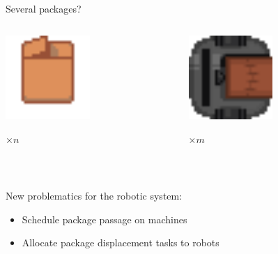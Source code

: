 \begin{frame}{Several packages?}
    \begin{columns}
        \begin{column}{0.5\textwidth}
            \centering
            \includegraphics[width = 0.5\textwidth]{images/godot/package.png}
            
            \Large $\times n$
        \end{column}
        \begin{column}{0.5\textwidth}
            \centering
            \includegraphics[width = 0.5\textwidth]{images/godot/robot_texture.png}
            
            \LARGE $\times m$
        \end{column}
    \end{columns}
    
    ~

    New problematics for the robotic system:
    \begin{itemize}
        \item Schedule package passage on machines
        \item Allocate package displacement tasks to robots
    \end{itemize}

    \centering
\end{frame}

